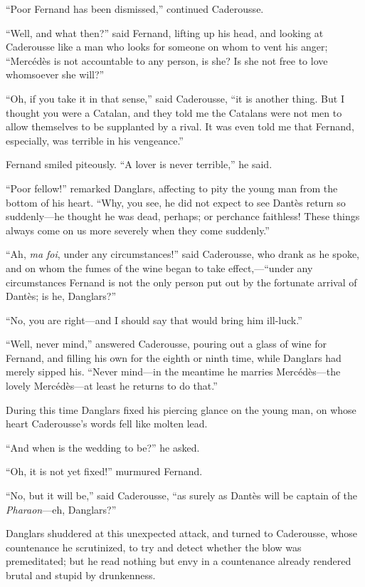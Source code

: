 “Poor Fernand has been dismissed,” continued Caderousse.

“Well, and what then?” said Fernand, lifting up his head, and looking
at Caderousse like a man who looks for someone on whom to vent his
anger; “Mercédès is not accountable to any person, is she? Is she not
free to love whomsoever she will?”

“Oh, if you take it in that sense,” said Caderousse, “it is another
thing. But I thought you were a Catalan, and they told me the Catalans
were not men to allow themselves to be supplanted by a rival. It was
even told me that Fernand, especially, was terrible in his vengeance.”

Fernand smiled piteously. “A lover is never terrible,” he said.

“Poor fellow!” remarked Danglars, affecting to pity the young man from
the bottom of his heart. “Why, you see, he did not expect to see Dantès
return so suddenly—he thought he was dead, perhaps; or perchance
faithless! These things always come on us more severely when they come
suddenly.”

“Ah, \textit{ma foi}, under any circumstances!” said Caderousse, who drank as
he spoke, and on whom the fumes of the wine began to take
effect,—“under any circumstances Fernand is not the only person put out
by the fortunate arrival of Dantès; is he, Danglars?”

“No, you are right—and I should say that would bring him ill-luck.”

“Well, never mind,” answered Caderousse, pouring out a glass of wine
for Fernand, and filling his own for the eighth or ninth time, while
Danglars had merely sipped his. “Never mind—in the meantime he marries
Mercédès—the lovely Mercédès—at least he returns to do that.”

During this time Danglars fixed his piercing glance on the young man,
on whose heart Caderousse’s words fell like molten lead.

“And when is the wedding to be?” he asked.

“Oh, it is not yet fixed!” murmured Fernand.

“No, but it will be,” said Caderousse, “as surely as Dantès will be
captain of the \textit{Pharaon}—eh, Danglars?”

Danglars shuddered at this unexpected attack, and turned to Caderousse,
whose countenance he scrutinized, to try and detect whether the blow
was premeditated; but he read nothing but envy in a countenance already
rendered brutal and stupid by drunkenness.

